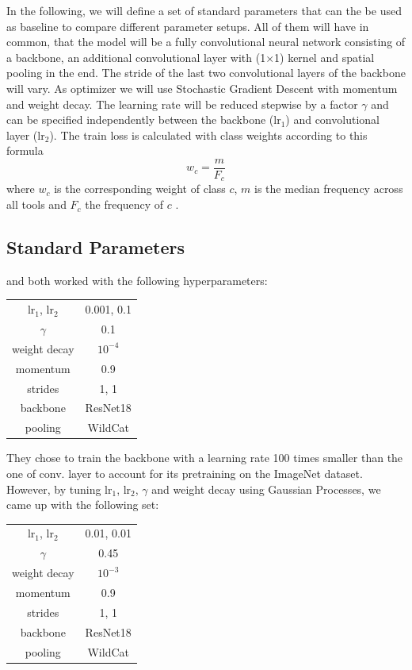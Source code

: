 In the following, we will define a set of standard parameters that can the be used as baseline to compare different parameter setups. All of them will have in common, that the model will be a fully convolutional neural network consisting of a backbone, an additional convolutional layer with (1$\times$1) kernel and spatial pooling in the end. The stride of the last two convolutional layers of the backbone will vary. As optimizer we will use Stochastic Gradient Descent with momentum and weight decay. The learning rate will be reduced stepwise by a factor $\gamma$ and can be specified independently between the backbone (lr$_1$) and convolutional layer (lr$_2$). The train loss is calculated with class weights according to this formula
\[w_c = \frac{m}{F_c}\]
where $w_c$ is the corresponding weight of class $c$, $m$ is the median frequency across all tools and $F_c$ the frequency of $c$ \citep{lstm}.

\subsection{Standard Parameters}

\cite{Vardazaryan} and \cite{lstm} both worked with the following hyperparameters:

\begin{center}
	\begin{tabular}{ c | c }
		lr$_1$, lr$_2$ & 0.001, 0.1\\  
		$\gamma$ & 0.1\\
		weight decay & $10^{-4}$\\
		\color{gray}momentum & \color{gray}0.9\\
		\color{gray}strides & \color{gray}1, 1\\
		\color{gray}backbone & \color{gray}ResNet18\\
		\color{gray}pooling & \color{gray}WildCat
	\end{tabular}
\end{center}

They chose to train the backbone with a learning rate 100 times smaller than the one of conv. layer to account for its pretraining on the ImageNet dataset.\\

However, by tuning lr$_1$, lr$_2$, $\gamma$ and weight decay using Gaussian Processes, we came up with the following set:

\begin{center}
	\begin{tabular}{ c | c }
		lr$_1$, lr$_2$ & 0.01, 0.01\\  
		$\gamma$ & 0.45\\
		weight decay & $10^{-3}$\\
		\color{gray}momentum & \color{gray}0.9\\
		\color{gray}strides & \color{gray}1, 1\\
		\color{gray}backbone & \color{gray}ResNet18\\
		\color{gray}pooling & \color{gray}WildCat
	\end{tabular}
\end{center}

